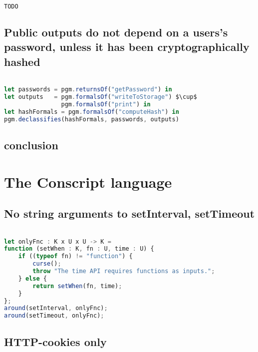 \begin{lstlisting}[label={lst:Policy5PidginQL},language=JavaScript,caption=Policy 5 in PidginQL,mathescape=true]  % float=t?

TODO
\end{lstlisting}

\subsection{Public outputs do not depend on a users's password, unless it has been cryptographically hashed}

\begin{lstlisting}[label={lst:Policy6PidginQL},language=JavaScript,caption=Policy 6 in PidginQL,mathescape=true]  % float=t?

let passwords = pgm.returnsOf("getPassword") in 
let outputs   = pgm.formalsOf("writeToStorage") $\cup$
                pgm.formalsOf("print") in
let hashFormals = pgm.formalsOf("computeHash") in
pgm.declassifies(hashFormals, passwords, outputs)
\end{lstlisting}

\subsection{conclusion}

\section{The Conscript language}
\label{sec:ValidationConscript}

\subsection{No string arguments to setInterval, setTimeout}

\begin{lstlisting}[label={lst:Policy7Conscript},language=JavaScript,caption=Policy 7 in ConScript,mathescape=true]  % float=t?

let onlyFnc : K x U x U -> K =
function (setWhen : K, fn : U, time : U) {
    if ((typeof fn) != "function") {
        curse();
        throw "The time API requires functions as inputs.";
    } else {
        return setWhen(fn, time);
    }
};
around(setInterval, onlyFnc); 
around(setTimeout, onlyFnc);
\end{lstlisting}

\subsection{HTTP-cookies only}

